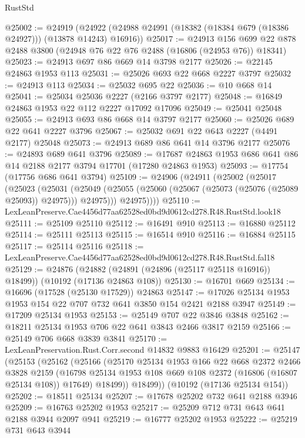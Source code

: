 \begin{lexlean}{RustStd}
\begin{coremodule}
@25002 := @24919
    (@24922 (@24988 @24991 (@18382 (@18384 @679 (@18386 @24927))) (@13878 @14243) @16916))
@25017 := @24913
    @156
    @699
    @22
    @878
    @2488
    @3800
    (@24948 @76 @22 @76 @2488 (@16806 (@24953 @76)) @18341)
@25023 := @24913 @697 @86 @669 @14 @3798 @2177
@25026 := @22145 @24863 @1953 @113
@25031 := @25026 @693 @22 @668 @2227 @3797
@25032 := @24913 @113
@25034 := @25032 @695 @22
@25036 := @10 @668 @14
@25041 := @25034 @25036 @2227 (@2166 @3797 @2177)
@25048 := @16849 @24863 @1953 @22 @112 @2227 @17092 @17096
@25049 := @25041 @25048
@25055 := @24913 @693 @86 @668 @14 @3797 @2177
@25060 := @25026 @689 @22 @641 @2227 @3796
@25067 := @25032 @691 @22 @643 @2227 (@4491 @2177) @25048
@25073 := @24913 @689 @86 @641 @14 @3796 @2177
@25076 := @24893 @689 @641 @3796
@25089 := @17687 @24863 @1953 @686 @641 @86 @14 @2188 @2177 @3794 @17701 (@17280 @24863 @1953)
@25093 := @17754 (@17756 @686 @641 @3794)
@25109 := @24906
    (@24911
      (@25002
        (@25017
          (@25023
            (@25031
              (@25049 (@25055 (@25060 (@25067 (@25073 (@25076 (@25089 @25093)) @24975))) @24975)))
            @24975))))
@25110 := LexLeanPreserve.Cae4456d77aa62528ed0bd9d0612cd278.R48.RustStd.look18
@25111 := @25109 @25110
@25112 := @16491 @910
@25113 := @16880 @25112
@25114 := @25111 @25113
@25115 := @16514 @910
@25116 := @16884 @25115
@25117 := @25114 @25116
@25118 := LexLeanPreserve.Cae4456d77aa62528ed0bd9d0612cd278.R48.RustStd.fal18
@25129 := @24876
    (@24882 (@24891 (@24896 (@25117 @25118 @16916)) @18499))
    (@10192 (@17136 @24863 @108))
@25130 := @16701 @669
@25134 := @16696 (@17528 (@25130 @17529)) @24863
@25147 := @17026 @25134 @1953 @1953 @154 @22 @707 @732 @641 @3850 @154 @2421 @2188 @3947
@25149 := @17209 @25134 @1953
@25153 := @25149 @707 @22 @3846 @3848
@25162 := @18211 @25134 @1953 @706 @22 @641 @3843 @2466 @3817 @2159
@25166 := @25149 @706 @668 @3839 @3841
@25170 := LexLeanPreservation.Rust.Corr.second @14832 @9883 @16429
@25201 := @25147
    (@25153
      (@25162
        (@25166
          (@25170
            @25134
            @1953
            @166
            @22
            @668
            @2372
            @2466
            @3828
            @2159
            (@16798 @25134 @1953 @108 @669 @108 @2372 (@16806 (@16807 @25134 @108)) @17649)
            @18499))
        @18499))
    (@10192 (@17136 @25134 @154))
@25202 := @18511 @25134
@25207 := @17678 @25202 @732 @641 @2188 @3946
@25209 := @16763 @25202 @1953
@25217 := @25209 @712 @731 @643 @641 @2188 @3944 @2097 @941
@25219 := @16777 @25202 @1953
@25222 := @25219 @731 @643 @3944

\end{coremodule}
\end{lexlean}
